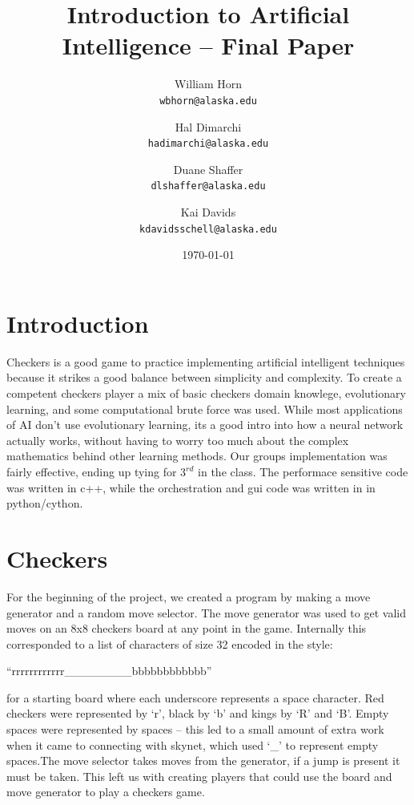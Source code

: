 \documentclass{article}
\begin{document}
\title{\textbf{Introduction to Artificial Intelligence -- Final Paper}}

\author{
  William Horn\\
  \texttt{wbhorn@alaska.edu}
  \and
  Hal Dimarchi\\
  \texttt{hadimarchi@alaska.edu}
  \and
  Duane Shaffer\\
  \texttt{dlshaffer@alaska.edu}
  \and
  Kai Davids\\
  \texttt{kdavidsschell@alaska.edu}
}
\date{\today}
\maketitle

\section{Introduction}

Checkers is a good game to practice implementing artificial intelligent techniques because it strikes a good
balance between simplicity and complexity. To create a competent checkers player a mix of basic checkers domain knowlege,
evolutionary learning, and some computational brute force was used. While most applications of AI don't use evolutionary
learning, its a good intro into how a neural network actually works, without having to worry too much about the complex
mathematics behind other learning methods. Our groups implementation was fairly effective, ending up tying for \(3^{rd}\) in the class.
The performace sensitive code was written in c++, while the orchestration and gui code was written in in python/cython.

\section{Checkers}

For the beginning of the project, we created a program by making a move generator and a random move selector. The move generator was used to get valid moves on an 8x8 checkers board at any point in the game. Internally this corresponded to a list of characters of size 32 encoded in the style:
\begin{displayquote}
``rrrrrrrrrrrr\_\_\_\_\_\_\_\_bbbbbbbbbbbb''
\end{displayquote}
for a starting board where each underscore represents a space character. Red checkers were represented by `r', black by `b' and kings by `R' and `B'. Empty spaces were represented by spaces -- this led to a small amount of extra work when it came to connecting with skynet, which used `\_' to represent empty spaces.The move selector takes moves from the generator, if a jump is present it must be taken. This left us with creating players that could use the board and move generator to play a checkers game.
\end{document}
